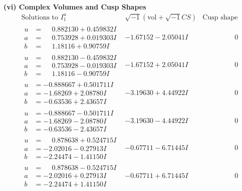 \documentclass[1p]{elsarticle_modified}
\theoremstyle{definition}
\newcommand{\I}{\sqrt{-1}}
\begin{document}
\newpage\flushleft \textbf{(vi) Complex Volumes and Cusp Shapes}
$$\begin{array}{c|c|c}  
\text{Solutions to }I^u_{1}& \I (\text{vol} + \sqrt{-1}CS) & \text{Cusp shape}\\
 \hline 
\begin{aligned}
u &= \phantom{-}0.882130 + 0.459832 I \\
a &= \phantom{-}0.753928 + 0.019303 I \\
b &= \phantom{-}1.18116 + 0.90759 I\end{aligned}
 & -1.67152 - 2.05041 I & \phantom{-0.000000 } 0 \\ \hline\begin{aligned}
u &= \phantom{-}0.882130 - 0.459832 I \\
a &= \phantom{-}0.753928 - 0.019303 I \\
b &= \phantom{-}1.18116 - 0.90759 I\end{aligned}
 & -1.67152 + 2.05041 I & \phantom{-0.000000 } 0 \\ \hline\begin{aligned}
u &= -0.888667 + 0.501711 I \\
a &= -1.68269 + 2.08780 I \\
b &= -0.63536 + 2.43657 I\end{aligned}
 & -3.19630 + 4.44922 I & \phantom{-0.000000 } 0 \\ \hline\begin{aligned}
u &= -0.888667 - 0.501711 I \\
a &= -1.68269 - 2.08780 I \\
b &= -0.63536 - 2.43657 I\end{aligned}
 & -3.19630 - 4.44922 I & \phantom{-0.000000 } 0 \\ \hline\begin{aligned}
u &= \phantom{-}0.878638 + 0.524715 I \\
a &= -2.02016 - 0.27913 I \\
b &= -2.24474 - 1.41150 I\end{aligned}
 & -0.67711 - 6.71445 I & \phantom{-0.000000 } 0 \\ \hline\begin{aligned}
u &= \phantom{-}0.878638 - 0.524715 I \\
a &= -2.02016 + 0.27913 I \\
b &= -2.24474 + 1.41150 I\end{aligned}
 & -0.67711 + 6.71445 I & \phantom{-0.000000 } 0 \\ \hline\begin{aligned}

\end{aligned}
\end{array}$$
\end{document}
